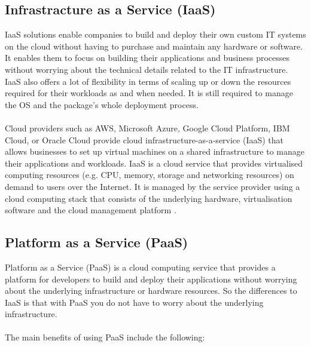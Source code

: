 \documentclass[BIF,Bachelor,nenglish]{twbook}%
\begin{document}
\subsection{Infrastracture as a Service (IaaS)}
IaaS solutions enable companies to build and deploy their own custom IT systems on the cloud without having to purchase and maintain any hardware or software. It enables them to focus on building their applications and business processes without worrying about the technical details related to the IT infrastructure. IaaS also offers a lot of flexibility in terms of scaling up or down the resources required for their workloads as and when needed. It is still required to manage the OS and the package's whole deployment process.
\\
\\
Cloud providers such as AWS, Microsoft Azure, Google Cloud Platform, IBM Cloud, or Oracle Cloud provide cloud infrastructure-as-a-service (IaaS) that allows businesses to set up virtual machines on a shared infrastructure to manage their applications and workloads. IaaS is a cloud service that provides virtualised computing resources (e.g. CPU, memory, storage and networking resources) on demand to users over the Internet. It is managed by the service provider using a cloud computing stack that consists of the underlying hardware, virtualisation software and the cloud management platform \cite{buy2019} .


\subsection{Platform as a Service (PaaS)}
Platform as a Service (PaaS) is a cloud computing service that provides a platform for developers to build and deploy their applications without worrying about the underlying infrastructure or hardware resources. So the differences to IaaS is that with PaaS you do not have to worry about the underlying infrastructure.
\\
\\
The main benefits of using PaaS include the following:
\end{document}
